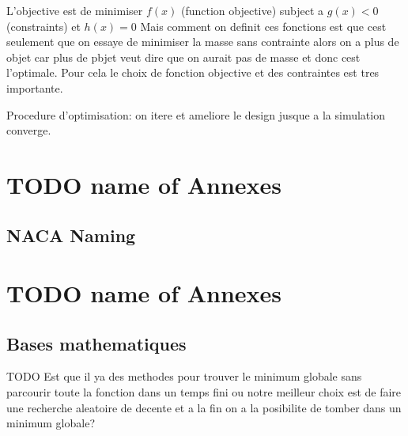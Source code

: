 \documentclass[12pt, a4paper
    ]{book}%
\theoremstyle{definition}
\theoremstyle{remark}
\begin{document}
L'objective est de minimiser $f(x)$ (function objective) subject a $g(x)<0$ (constraints) et  $h(x)=0$ 
Mais comment on definit ces fonctions est que cest seulement que on essaye de minimiser la masse sans contrainte alors on a plus de objet car plus de pbjet veut dire que on aurait pas de masse et donc cest l'optimale. Pour cela le choix de fonction objective et des contraintes est tres importante. 

Procedure d'optimisation: on itere et ameliore le design jusque a la simulation converge. 





\newpage
\thispagestyle{empty}
\nocite{*}
\printbibliography[title = Bibliographie] %



\newpage

\appendix
{}
\chapter{TODO name of Annexes}
\renewcommand{\thefigure}{A\arabic{figure}}
\setcounter{figure}{0}
\setcounter{page}{1}
\renewcommand{\thepage}{A-\arabic{page}}

\section{NACA Naming}


\chapter{TODO name of Annexes}
\setcounter{page}{1}
\renewcommand{\thepage}{B-\arabic{page}}

\section{Bases mathematiques}



% 
TODO Est que il ya  des methodes pour trouver le minimum globale sans parcourir toute la fonction dans un temps fini ou notre meilleur choix est de faire une recherche aleatoire de decente et a la fin on a la posibilite de tomber dans un minimum globale?
\end{document}
